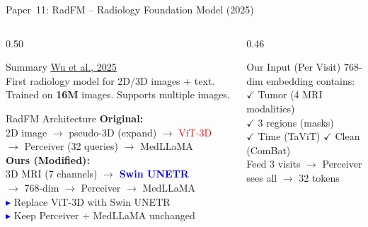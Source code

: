 \documentclass[aspectratio=169,xcolor=dvipsnames]{beamer}
\begin{document}
\begin{frame}{Paper~11: RadFM -- Radiology Foundation Model (2025)}
    \begin{columns}
        \begin{column}{0.50\textwidth}
            \begin{block}{Summary}
                \small
                \href{https://arxiv.org/abs/2308.02463}{Wu et al., 2025}\\[0.3em]
                First radiology model for 2D/3D images + text. Trained on \textbf{16M} images. Supports multiple images.
            \end{block}

            \vspace{0.2em}

            \begin{block}{RadFM Architecture}
                \scriptsize
                \textbf{Original:}\\[0.1em]
                2D image $\to$ pseudo-3D (expand) $\to$ \textcolor{red}{ViT-3D}\\[0.1em]
                $\to$ Perceiver (32 queries) $\to$ MedLLaMA\\[0.3em]
                \textbf{Ours (Modified):}\\[0.1em]
                3D MRI (7 channels) $\to$ \textcolor{blue}{\textbf{Swin UNETR}}\\[0.1em]
                $\to$ 768-dim $\to$ Perceiver $\to$ MedLLaMA\\[0.2em]
                \textcolor{blue}{$\blacktriangleright$} Replace ViT-3D with Swin UNETR\\
                \textcolor{blue}{$\blacktriangleright$} Keep Perceiver + MedLLaMA unchanged
            \end{block}
        \end{column}

        \begin{column}{0.46\textwidth}
            \begin{alertblock}{Our Input (Per Visit)}
                \scriptsize
                768-dim embedding contains:\\[0.1em]
                $\checkmark$ Tumor (4 MRI modalities)\\[0.1em]
                $\checkmark$ 3 regions (masks)\\[0.1em]
                $\checkmark$ Time (TaViT) $\checkmark$ Clean (ComBat)\\[0.2em]
                Feed 3 visits $\to$ Perceiver sees all $\to$ 32 tokens
            \end{alertblock}


\end{column}
\end{columns}
\end{frame}
\end{document}
